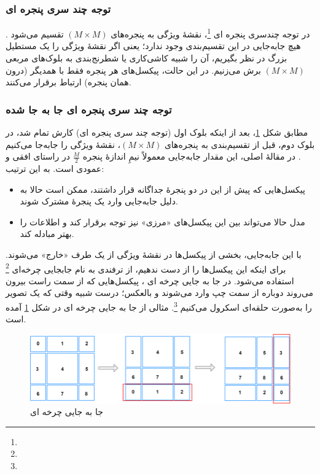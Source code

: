 \subsubsection{توجه چند سری پنجره ای}
در توجه چندسری پنجره ای \footnote{}، نقشهٔ ویژگی به پنجره‌های \(\displaystyle (M \times M)\) تقسیم می‌شود \cite{liu2021swintransformer}.
هیچ جابه‌جایی در این تقسیم‌بندی وجود ندارد؛ یعنی اگر نقشهٔ ویژگی را یک مستطیل بزرگ در نظر بگیریم،
آن را شبیه کاشی‌کاری یا شطرنج‌بندی به بلوک‌های مربعی \(\displaystyle (M \times M)\) برش می‌زنیم.
در این حالت، پیکسل‌های هر پنجره فقط با همدیگر (درون همان پنجره) ارتباط برقرار می‌کنند.

\subsubsection{توجه چند سری پنجره ای جا به جا شده}
مطابق شکل \ref{fig:Cycle Shift in Swin Tranformer}، بعد از اینکه بلوک اول (توجه چند سری پنجره ای) کارش تمام شد، در بلوک دوم، قبل از تقسیم‌بندی به پنجره‌های 
\(\displaystyle (M \times M)\)، نقشهٔ ویژگی را جابه‌جا  می‌کنیم \cite{liu2021swintransformer}.
در مقالهٔ اصلی، این مقدار جابه‌جایی معمولاً نیمِ اندازهٔ پنجره 
\(\displaystyle \frac{M}{2}\)
در راستای افقی و عمودی است. به این ترتیب:

\begin{itemize}
	\item پیکسل‌هایی که پیش از این در دو پنجرهٔ جداگانه قرار داشتند، ممکن است حالا به دلیل جابه‌جایی وارد یک پنجرهٔ مشترک شوند.
	\item مدل حالا می‌تواند بین این پیکسل‌های «مرزی» نیز  توجه برقرار کند و اطلاعات را بهتر مبادله کند.
\end{itemize}

با این جابه‌جایی، بخشی از پیکسل‌ها در نقشهٔ ویژگی از یک طرف «خارج» می‌شوند. برای اینکه این پیکسل‌ها را از دست ندهیم، از ترفندی به نام  جابجایی چرخه‌ای \footnote{} استفاده می‌شود. در جا به جایی چرخه ای ، پیکسل‌هایی که از سمت راست بیرون می‌روند دوباره از سمت چپ وارد می‌شوند و بالعکس؛ درست شبیه وقتی که یک تصویر را به‌صورت حلقه‌ای اسکرول می‌کنیم \footnote{}. مثالی از جا به جایی چرخه ای  در شکل \ref{fig:Cycle Shift in Swin Tranformer} آمده است.

\begin{figure}[h]
	\centering
	\begin{minipage}[b]{1\textwidth}
		\centering
		\includegraphics[width=\textwidth]{transformer_images/cycle_shift.png}
		\caption{جا به جایی چرخه ای}
		\label{fig:Cycle Shift in Swin Tranformer}
	\end{minipage}
	\hfill
\end{figure}

